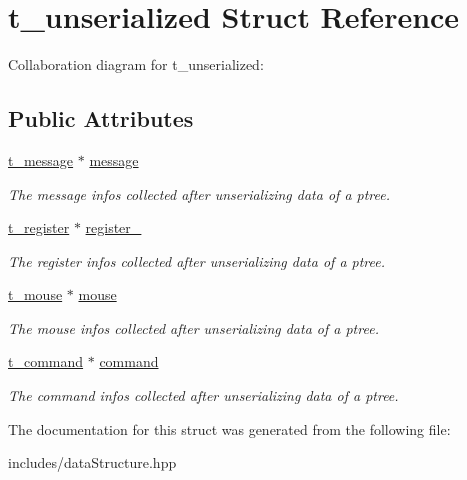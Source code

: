 \hypertarget{structt__unserialized}{}\section{t\+\_\+unserialized Struct Reference}
\label{structt__unserialized}


Collaboration diagram for t\+\_\+unserialized\+:
\subsection*{Public Attributes}
\begin{DoxyCompactItemize}
\item 
\mbox{\label{structt__unserialized_ae9ce859624af4012b61c23517789481c}} 
\hyperlink{structt__message}{t\+\_\+message} $\ast$ \hyperlink{structt__unserialized_ae9ce859624af4012b61c23517789481c}{message}
\begin{DoxyCompactList}\small\item\em The message infos collected after unserializing data of a ptree. \end{DoxyCompactList}\item 
\mbox{\label{structt__unserialized_a8c4c8dc99720b353dd51eca800dfe02c}} 
\hyperlink{structt__register}{t\+\_\+register} $\ast$ \hyperlink{structt__unserialized_a8c4c8dc99720b353dd51eca800dfe02c}{register\+\_\+}
\begin{DoxyCompactList}\small\item\em The register infos collected after unserializing data of a ptree. \end{DoxyCompactList}\item 
\mbox{\label{structt__unserialized_af75e67d0d44cbcb77154a1090e3380f0}} 
\hyperlink{structt__mouse}{t\+\_\+mouse} $\ast$ \hyperlink{structt__unserialized_af75e67d0d44cbcb77154a1090e3380f0}{mouse}
\begin{DoxyCompactList}\small\item\em The mouse infos collected after unserializing data of a ptree. \end{DoxyCompactList}\item 
\mbox{\label{structt__unserialized_acdd08ba2aad8aba936bb5f7933dd6a0a}} 
\hyperlink{structt__command}{t\+\_\+command} $\ast$ \hyperlink{structt__unserialized_acdd08ba2aad8aba936bb5f7933dd6a0a}{command}
\begin{DoxyCompactList}\small\item\em The command infos collected after unserializing data of a ptree. \end{DoxyCompactList}\end{DoxyCompactItemize}


The documentation for this struct was generated from the following file\+:\begin{DoxyCompactItemize}
\item 
includes/data\+Structure.\+hpp\end{DoxyCompactItemize}
